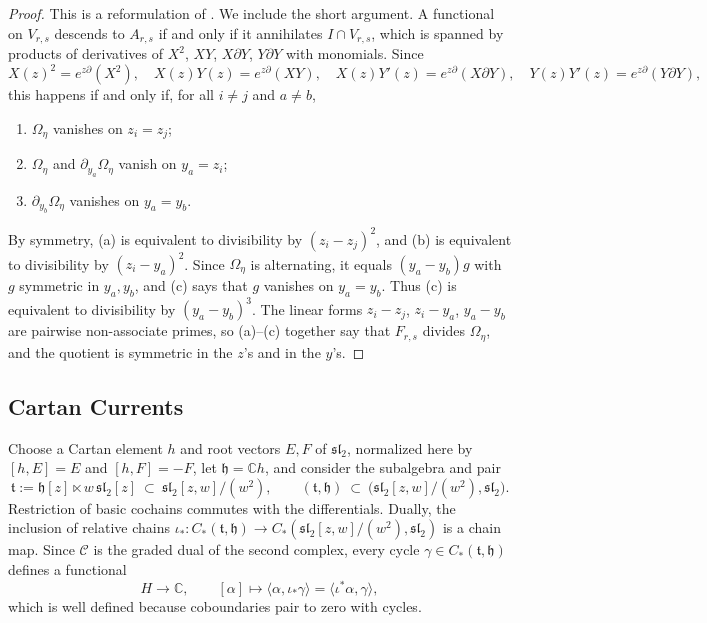 \documentclass[11pt]{amsart}
\numberwithin{equation}{section}
\theoremstyle{definition}
\theoremstyle{remark}
\newcommand{\C}{\mathbb{C}}
\newcommand{\sltwo}{\mathfrak{sl}_2}
\newcommand{\hh}{\mathfrak{h}}
\newcommand{\tl}{\mathfrak{t}}
\newcommand{\dd}{\partial}
\newcommand{\cC}{\mathcal{C}}
\begin{document}
\begin{proof}
This is a reformulation of \cite[(2.54)]{Kha26}. We include the short argument. A functional on $V_{r,s}$ descends to $A_{r,s}$ if and only if it annihilates $I\cap V_{r,s}$, which is spanned by products of derivatives of $X^2$, $XY$, $X\dd Y$, $Y\dd Y$ with monomials. Since
\begin{equation}\label{eq:exp-relations}
X(z)^2=e^{z\dd}(X^2),\quad X(z)Y(z)=e^{z\dd}(XY),\quad X(z)Y'(z)=e^{z\dd}(X\dd Y),\quad Y(z)Y'(z)=e^{z\dd}(Y\dd Y),
\end{equation}
this happens if and only if, for all $i\ne j$ and $a\ne b$,
\begin{enumerate}[label=(\alph*),leftmargin=2em]
\item $\Omega_\eta$ vanishes on $z_i=z_j$;
\item $\Omega_\eta$ and $\dd_{y_a}\Omega_\eta$ vanish on $y_a=z_i$;
\item $\dd_{y_b}\Omega_\eta$ vanishes on $y_a=y_b$.
\end{enumerate}
By symmetry, (a) is equivalent to divisibility by $(z_i-z_j)^2$, and (b) is equivalent to divisibility by $(z_i-y_a)^2$. Since $\Omega_\eta$ is alternating, it equals $(y_a-y_b)g$ with $g$ symmetric in $y_a,y_b$, and (c) says that $g$ vanishes on $y_a=y_b$. Thus (c) is equivalent to divisibility by $(y_a-y_b)^3$. The linear forms $z_i-z_j$, $z_i-y_a$, $y_a-y_b$ are pairwise non-associate primes, so (a)--(c) together say that $F_{r,s}$ divides $\Omega_\eta$, and the quotient is symmetric in the $z$'s and in the $y$'s.
\end{proof}

\subsection{Cartan Currents}
Choose a Cartan element $h$ and root vectors $E,F$ of $\sltwo$, normalized here by $[h,E]=E$ and $[h,F]=-F$, let $\hh=\C h$, and consider the subalgebra and pair
\begin{equation}\label{eq:Cartan-pair}
\tl:=\hh[z]\ltimes w\,\sltwo[z]\ \subset\ \sltwo[z,w]/(w^2),\qquad (\tl,\hh)\ \subset\ \bigl(\sltwo[z,w]/(w^2),\sltwo\bigr).
\end{equation}
Restriction of basic cochains commutes with the differentials. Dually, the inclusion of relative chains $\iota_*:C_*(\tl,\hh)\to C_*(\sltwo[z,w]/(w^2),\sltwo)$ is a chain map. Since $\cC$ is the graded dual of the second complex, every cycle $\gamma\in C_*(\tl,\hh)$ defines a functional
\begin{equation}\label{eq:cycle-functional}
H\longrightarrow\C,\qquad [\alpha]\longmapsto\langle\alpha,\iota_*\gamma\rangle=\langle\iota^*\alpha,\gamma\rangle,
\end{equation}
which is well defined because coboundaries pair to zero with cycles.
\end{document}
